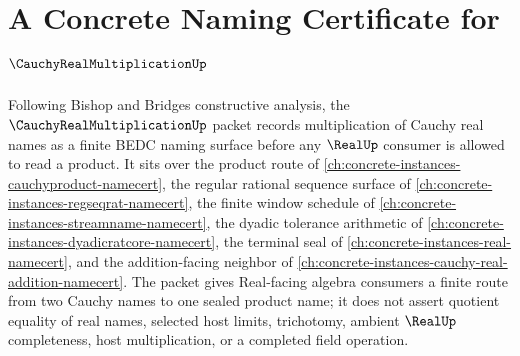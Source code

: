 \chapter{A Concrete Naming Certificate for $\CauchyRealMultiplicationUp$}
\label{ch:concrete-instances-cauchy-real-multiplication-namecert}

Following Bishop and Bridges constructive analysis, the $\CauchyRealMultiplicationUp$ packet records multiplication of Cauchy real names as a finite BEDC naming surface before any $\RealUp$ consumer is allowed to read a product. It sits over the product route of \autoref{ch:concrete-instances-cauchyproduct-namecert}, the regular rational sequence surface of \autoref{ch:concrete-instances-regseqrat-namecert}, the finite window schedule of \autoref{ch:concrete-instances-streamname-namecert}, the dyadic tolerance arithmetic of \autoref{ch:concrete-instances-dyadicratcore-namecert}, the terminal seal of \autoref{ch:concrete-instances-real-namecert}, and the addition-facing neighbor of \autoref{ch:concrete-instances-cauchy-real-addition-namecert}. The packet gives Real-facing algebra consumers a finite route from two Cauchy names to one sealed product name; it does not assert quotient equality of real names, selected host limits, trichotomy, ambient $\RealUp$ completeness, host multiplication, or a completed field operation.

